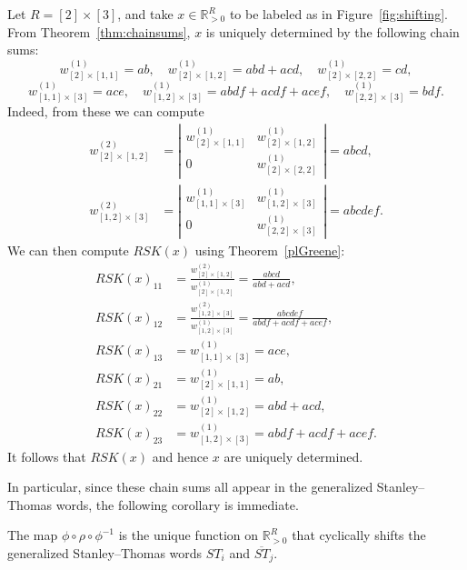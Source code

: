 \documentclass[ALCO,Unicode,published]{cedram}
\numberwithin{equation}{section}
\begin{document}
\begin{Ex}
    Let $R = [2] \times [3]$, and take $x \in \mathbb R_{>0}^R$ to be labeled as in Figure~\ref{fig:shifting}. From Theorem~\ref{thm:chainsums}, $x$ is uniquely determined by the following chain sums:
    \[
    w_{[2] \times [1,1]}^{(1)} = ab, \quad w_{[2] \times [1,2]}^{(1)} = abd+acd,\quad w_{[2] \times [2,2]}^{(1)} = cd, \]\[w_{[1,1] \times [3]}^{(1)} = ace, \quad w_{[1,2] \times [3]}^{(1)} = abdf+acdf+acef, \quad w_{[2,2] \times [3]}^{(1)} = bdf.\]
    Indeed, from these we can compute
    \begin{align*}
        w_{[2] \times [1,2]}^{(2)} &= \left|\begin{matrix}w_{[2] \times [1,1]}^{(1)} & w_{[2] \times [1,2]}^{(1)}\\0&w_{[2] \times [2,2]}^{(1)}\end{matrix}\right|  = abcd,\\
        w_{[1,2] \times [3]}^{(2)} &= \left|\begin{matrix}w^{(1)}_{[1,1] \times [3]} &w^{(1)}_{[1,2] \times [3]}\\0& w^{(1)}_{[2,2] \times [3]}\end{matrix}\right| = abcdef.
    \end{align*}
    We can then compute $RSK(x)$ using Theorem~\ref{plGreene}:
    \begin{align*}
        RSK(x)_{11} &= \frac{w_{[2] \times [1,2]}^{(2)}}{w_{[2] \times [1,2]}^{(1)}} = \frac{abcd}{abd+acd},\\
        RSK(x)_{12} &= \frac{w_{[1,2] \times [3]}^{(2)}}{w_{[1,2] \times [3]}^{(1)}} = \frac{abcdef}{abdf+acdf+acef},\\
        RSK(x)_{13} &= w_{[1,1] \times [3]}^{(1)} = ace,\\
        RSK(x)_{21} &=  w_{[2] \times [1,1]}^{(1)} = ab,\\
        RSK(x)_{22} &=  w_{[2] \times [1,2]}^{(1)} = abd+acd,\\
        RSK(x)_{23} &= w_{[1,2] \times [3]}^{(1)} = abdf+acdf+acef.
    \end{align*}
    It follows that $RSK(x)$ and hence $x$ are uniquely determined.
\end{Ex}

In particular, since these chain sums all appear in the generalized Stanley--Thomas words, the following corollary is immediate.

\begin{Cor}
The map $\phi \circ \rho \circ \phi^{-1}$ is the unique function on $\mathbb R^R_{>0}$ that cyclically shifts the generalized Stanley--Thomas words $ST_i$ and $\overline{ST}_j$.
\end{Cor}
\end{document}
